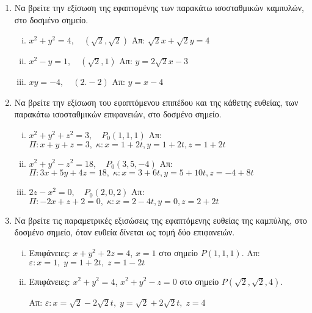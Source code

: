 \begin{enumerate}
\item Να βρείτε την εξίσωση της εφαπτομένης των παρακάτω ισοσταθμικών καμπυλών, στο
  δοσμένο σημείο.
  \begin{enumerate}[i)]
    \item $ x^{2}+y^{2} = 4, \quad (\sqrt{2} , \sqrt{2}) $ 
      \hfill Απ: $ \sqrt{2} x + \sqrt{2} y = 4 $
    \item $ x^{2}-y=1, \quad (\sqrt{2} ,1) $ \hfill Απ: $ y=2 \sqrt{2} x - 3 $
    \item $ xy=-4, \quad (2.-2) $ \hfill Απ: $ y=x-4 $
  \end{enumerate}

\item Να βρείτε την εξίσωση του εφαπτόμενου επιπέδου και της κάθετης ευθείας, των 
  παρακάτω ισοσταθμικών επιφανειών, στο δοσμένο σημείο.
  \begin{enumerate}[i)]
    \item $ x^{2}+y^{2}+z^{2}=3, \quad P_{0}(1,1,1) $ 
      \hfill Απ: $ \Pi :  x+y+z=3, \; \kappa : x=1+2t,y=1+2t,z=1+2t $
    \item $ x^{2}+y^{2}-z^{2}=18, \quad P_{0}(3,5,-4) $
      \hfill Απ: $ \Pi : 3x+5y+4z=18, \; \kappa : x=3+6t,y=5+10t,z=-4+8t $
    \item $ 2z-x^{2}=0, \quad P_{0}(2,0,2) $ 
      \hfill Απ: $ \Pi : -2x+z+2=0, \; \kappa : x=2-4t,y=0,z=2+2t $
  \end{enumerate}

  \enlargethispage{3\baselineskip}

\item Να βρείτε τις παραμετρικές εξισώσεις της εφαπτόμενης ευθείας της καμπύλης, στο 
  δοσμένο σημείο, όταν ευθεία δίνεται ως τομή δύο επιφανειών.
  \begin{enumerate}[i)]
    \item Επιφάνειες: $ x+y^{2}+2z = 4 $, $ x=1 $ στο σημείο $ P(1,1,1) $.
      \hfill Απ: $ \varepsilon : x=1,\;y=1+2t,\;z=1-2t $ 
    \item Επιφάνειες: $x^{2}+y^{2}=4$, $x^{2}+y^{2}-z=0$ στο σημείο $ P(\sqrt{2} ,
      \sqrt{2} , 4) $.

      \hfill Απ: $ \varepsilon : x= \sqrt{2} -2 \sqrt{2}t,\;y= \sqrt{2} +2 \sqrt{2}t,
      \;z=4$ 
  \end{enumerate}
\end{enumerate}





